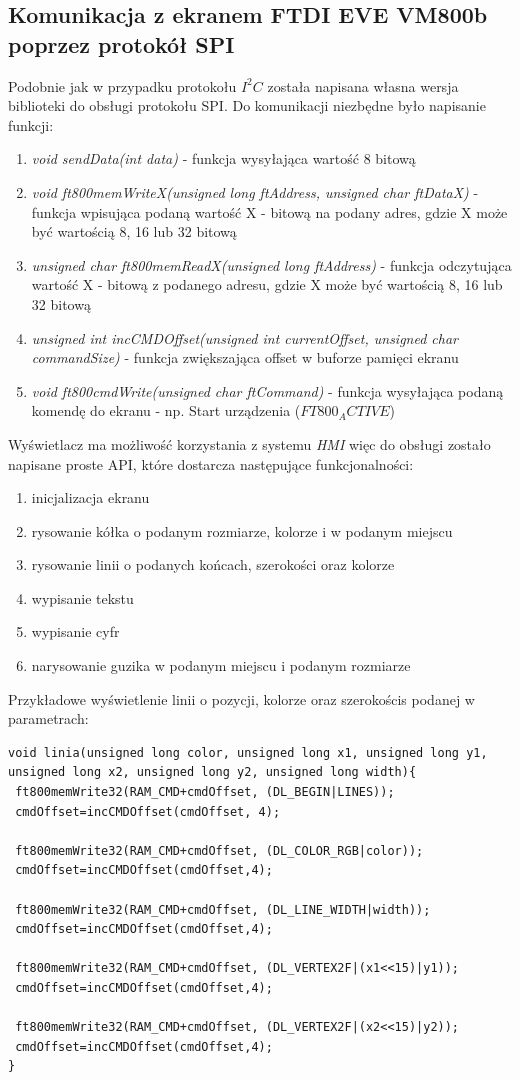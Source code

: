 \documentclass{xmgr}
\begin{document}
\subsection{Komunikacja z ekranem FTDI EVE VM800b poprzez protokół SPI}
Podobnie jak w przypadku protokołu $I^2C$ została napisana własna wersja biblioteki do obsługi protokołu SPI. Do komunikacji niezbędne było napisanie funkcji:
\begin{enumerate}
	\item \emph{void sendData(int data)} - funkcja wysyłająca wartość 8 bitową
	\item \emph{void ft800memWriteX(unsigned long ftAddress, unsigned char ftDataX)} - funkcja wpisująca podaną wartość X - bitową na podany adres, gdzie X może być wartością 8, 16 lub 32 bitową
	\item \emph{unsigned char ft800memReadX(unsigned long ftAddress)} - funkcja odczytująca wartość X - bitową z podanego adresu, gdzie X może być wartością 8, 16 lub 32 bitową
	\item \emph{unsigned int incCMDOffset(unsigned int currentOffset, unsigned char commandSize)} - funkcja zwiększająca offset w buforze pamięci ekranu
	\item \emph{void ft800cmdWrite(unsigned char ftCommand)} - funkcja wysyłająca podaną komendę do ekranu - np. Start urządzenia ($FT800_ACTIVE$)
\end{enumerate}

Wyświetlacz ma możliwość korzystania z systemu \emph{HMI} więc do obsługi zostało napisane proste API, które dostarcza następujące funkcjonalności:
 \begin{enumerate}
	\item inicjalizacja ekranu
	\item rysowanie kółka o podanym rozmiarze, kolorze i w podanym miejscu
	\item rysowanie linii o podanych końcach, szerokości oraz kolorze
	\item wypisanie tekstu
	\item wypisanie cyfr
	\item narysowanie guzika w podanym miejscu i podanym rozmiarze
\end{enumerate}

Przykładowe wyświetlenie linii o pozycji, kolorze oraz szerokościs podanej w parametrach:
\begin{lstlisting}[label=bot-dirs-alg,caption=Narysowanie linii na ekranie]
void linia(unsigned long color, unsigned long x1, unsigned long y1, 
unsigned long x2, unsigned long y2, unsigned long width){
 ft800memWrite32(RAM_CMD+cmdOffset, (DL_BEGIN|LINES));
 cmdOffset=incCMDOffset(cmdOffset, 4);
 
 ft800memWrite32(RAM_CMD+cmdOffset, (DL_COLOR_RGB|color));
 cmdOffset=incCMDOffset(cmdOffset,4);

 ft800memWrite32(RAM_CMD+cmdOffset, (DL_LINE_WIDTH|width));
 cmdOffset=incCMDOffset(cmdOffset,4);

 ft800memWrite32(RAM_CMD+cmdOffset, (DL_VERTEX2F|(x1<<15)|y1));
 cmdOffset=incCMDOffset(cmdOffset,4);
  
 ft800memWrite32(RAM_CMD+cmdOffset, (DL_VERTEX2F|(x2<<15)|y2));
 cmdOffset=incCMDOffset(cmdOffset,4);	
}
\end{lstlisting}
\end{document}

